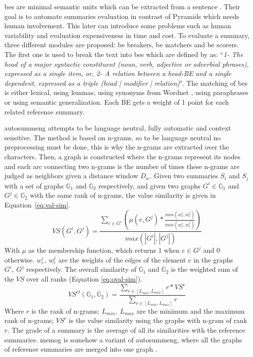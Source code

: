 \acp{be} are minimal semantic units which can be extracted from a sentence \citep{06-hovy-al}. 
Their goal is to automate summaries evaluation in contrast of Pyramids which needs human involvement. 
This later can introduce some problems such as human variability and evaluation expensiveness in time and cost.
To evaluate a summary, three different modules are proposed: \ac{be} breakers, \ac{be} matchers and \ac{be} scorers. 
The first one is used to break the text into \acp{be} which are defined by \citep{06-hovy-al} as:
``\textit{1- The head of a major syntactic constituent (noun, verb, adjective or adverbial phrases), expressed as a 	single item, or, 2- A relation between a head-BE and a single dependent, expressed as a triple (head | modifier | relation)}".
The matching of \acp{be} is either lexical, using lemmas, using synonyms from Wordnet \citep{95-miller}, using paraphrases or using semantic generalization.
Each BE gets a weight of 1 point for each related reference summary.

\ac{autosummeng} \citep{06-giannakopoulos-al} attempts to be language neutral, fully automatic and context sensitive.
The method is based on n-grams, so to be language neutral no preprocessing must be done, this is why the n-grams are extracted over the characters.
Then, a graph is constructed where the n-grams represent its nodes and each arc connecting two n-grams is the number of times these n-grams are judged as neighbors given a distance window $ D_w $. 
Given two summaries $ S_i $ and $ S_j $ with a set of graphs $ \mathbb{G}_1 $ and $ \mathbb{G}_2 $ respectively, and given two graphs $ G^i \in \mathbb{G}_1 $ and $ G^j \in \mathbb{G}_2 $ with the same rank of n-grams, the value similarity is given in Equation~\ref{eq:val-sim}.
\begin{equation}
	\label{eq:val-sim}
	VS(G^i, G^j) = 
	\frac{\sum_{e \in G^i} \left(\mu(e, G^j) * \frac{min(w_e^i, w_e^j)}{min(w_e^i, w_e^j)}\right)}{max(|G^i|, |G^j|)}
\end{equation}
With $ \mu $ as the membership function, which returns 1 when $ e \in G^j $ and 0 otherwise.
$ w_e^i,\ w_e^j $ are the weights of the edges of the element $ e $ in the graphs $ G^i,\ G^j $ respectively.
The overall similarity of $ \mathbb{G}_1 $ and $ \mathbb{G}_2 $ is the weighted sum of the $ VS $ over all ranks (Equation \ref{eq:oval-sim}).
\begin{equation}
	\label{eq:oval-sim}
	VS^O(\mathbb{G}_1, \mathbb{G}_2) = 
	\frac{\sum_{r \in [L_{min}, L_{max}] } r * VS^r }{\sum_{r \in [L_{min}, L_{max}]} r}
\end{equation}
Where $ r $ is the rank of n-grams; 
$ L_{min},\ L_{max} $ are the minimum and the maximum rank of n-grams; 
$ VS^r $ is the value similarity using the graphs with n-gram of rank $ r $.
The grade of a summary is the average of all its similarities with the reference summaries. 
\ac{memog} is somehow a variant of \ac{autosummeng}, where all the graphs of reference summaries are merged into one graph \citep{10-giannakopoulos-karkaletsis}.


